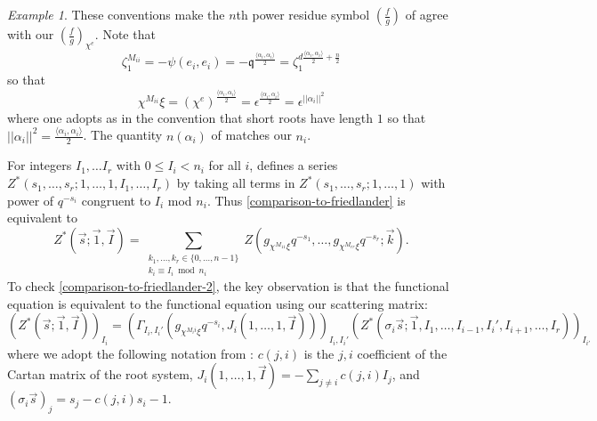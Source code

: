 \documentclass[11pt,letterpaper]{article}
\theoremstyle{definition}
\theoremstyle{remark}
\newtheorem{example}[theorem]{Example}
\numberwithin{equation}{section}
\theoremstyle{dotless}
\newcommand{\hchi}{\psi} %
\newcommand{\gene}{\zeta_1} %
\begin{document}
\begin{example}
These conventions make the $n$th power residue symbol $\left( \frac{f}{g} \right)$ of \cite{HFriedlander23} agree with our $\left(\frac{f}{g}\right)_{\chi^e}$. Note that \[ \gene^{M_{ii}} = - \hchi(e_i,e_i) = -\mathfrak q^{\frac{\langle \alpha_i,\alpha_i \rangle }{2}} = \gene^{ d \frac{\langle \alpha_i,\alpha_i \rangle}{2} + \frac{n}{2}}\] so that \[\chi^{M_{ii}} \xi = (\chi^e)^{ \frac{ \langle \alpha_i,\alpha_i \rangle}{2}} =\epsilon^{\frac{ \langle \alpha_i,\alpha_i \rangle}{2}} =\epsilon^{||\alpha_i||^2 }\]  where one adopts as in  \cite{HFriedlander23} the convention that short roots have length $1$ so that $||\alpha_i||^2=\frac{ \langle \alpha_i,\alpha_i\rangle}{2}$. The quantity $n(\alpha_i)$ of \cite{HFriedlander23} matches our $n_i$.

For integers $I_1,\dots I_r$ with $0 \leq I_i < n_i$ for all $i$, \cite{HFriedlander23} defines a series $Z^* ( s_1,\dots,s_r;1,\dots,1, I_1,\dots,I_r)$ by taking all terms in $Z^* ( s_1,\dots,s_r;1,\dots,1)$ with power of $q^{-s_i}$ congruent to $I_i$ mod $n_i$. Thus \eqref{comparison-to-friedlander} is equivalent to
\begin{equation}\label{comparison-to-friedlander-2}  Z^* ( \vec{s} ;\vec{1} , \vec{I} )= \sum_{ \substack{ k_1,\dots, k_r \in \{0,\dots,n-1\} \\ k_i \equiv I_i \bmod n_i}} Z ( g_{ \chi^{M_{11}} \xi} q^{-s_1}, \dots, g_{ \chi^{M_{rr}} \xi} q^{-s_r}; \vec{k} ) .\end{equation}   
To check \eqref{comparison-to-friedlander-2}, the key observation is that the functional equation \cite[(20)]{HFriedlander23} is equivalent to the functional equation using our scattering matrix:
\begin{equation}\label{comparison-vfe} (Z^* ( \vec{s} ;\vec{1} ,\vec{I} ))_{I_i} = ( \Gamma_{I_i, I_i'}( g_{\chi^{M_ii}\xi} q^{-s_i}, J_i (1,\dots,1,\vec{I} )))_{I_i, I_i'}  (Z^*( \sigma_i \vec{s}; \vec{1}, I_1,\dots, I_{i-1}, I_i' , I_{i+1},\dots, I_r))_{I_{i'} }\end{equation}
where we adopt the following notation from \cite{HFriedlander23}: $c(j,i)$ is the $j,i$ coefficient of the Cartan matrix of the root system, $ J_i (1,\dots,1,\vec{I} )=-\sum_{j \neq i} c(j,i) I_j$, and $(\sigma_i \vec{s})_j =s_j - c(j,i) s_i-1$. 


\end{example}
\end{document}
